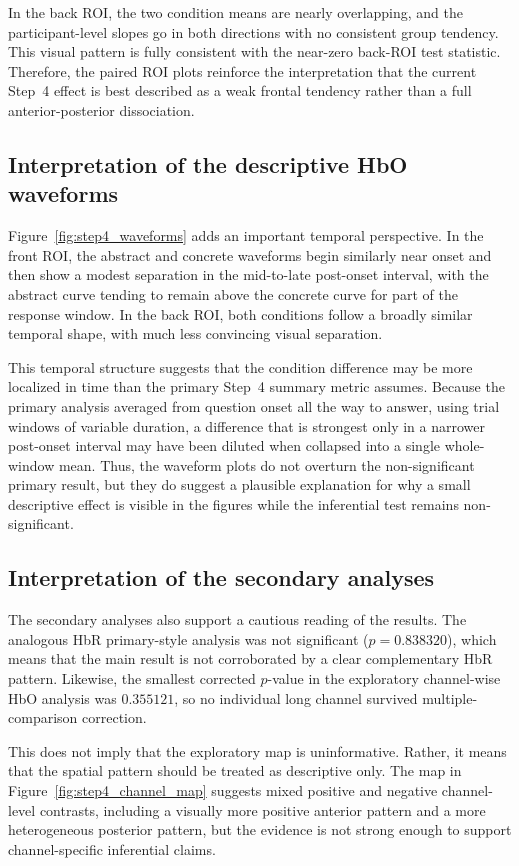 In the back ROI, the two condition means are nearly overlapping, and the participant-level slopes go
in both directions with no consistent group tendency.
This visual pattern is fully consistent with the near-zero back-ROI test statistic.
Therefore, the paired ROI plots reinforce the interpretation that the current Step~4 effect is best
described as a weak frontal tendency rather than a full anterior-posterior dissociation.

\subsection{Interpretation of the descriptive HbO waveforms}
Figure~\ref{fig:step4_waveforms} adds an important temporal perspective.
In the front ROI, the abstract and concrete waveforms begin similarly near onset and then show a
modest separation in the mid-to-late post-onset interval, with the abstract curve tending to remain
above the concrete curve for part of the response window.
In the back ROI, both conditions follow a broadly similar temporal shape, with much less convincing
visual separation.

This temporal structure suggests that the condition difference may be more localized in time than the
primary Step~4 summary metric assumes.
Because the primary analysis averaged from question onset all the way to answer, using trial windows
of variable duration, a difference that is strongest only in a narrower post-onset interval may have
been diluted when collapsed into a single whole-window mean.
Thus, the waveform plots do not overturn the non-significant primary result, but they do suggest a
plausible explanation for why a small descriptive effect is visible in the figures while the inferential
test remains non-significant.

\subsection{Interpretation of the secondary analyses}
The secondary analyses also support a cautious reading of the results.
The analogous HbR primary-style analysis was not significant ($p=0.838320$), which means that the
main result is not corroborated by a clear complementary HbR pattern.
Likewise, the smallest corrected $p$-value in the exploratory channel-wise HbO analysis was
$0.355121$, so no individual long channel survived multiple-comparison correction.

This does not imply that the exploratory map is uninformative.
Rather, it means that the spatial pattern should be treated as descriptive only.
The map in Figure~\ref{fig:step4_channel_map} suggests mixed positive and negative channel-level
contrasts, including a visually more positive anterior pattern and a more heterogeneous posterior
pattern, but the evidence is not strong enough to support channel-specific inferential claims.

